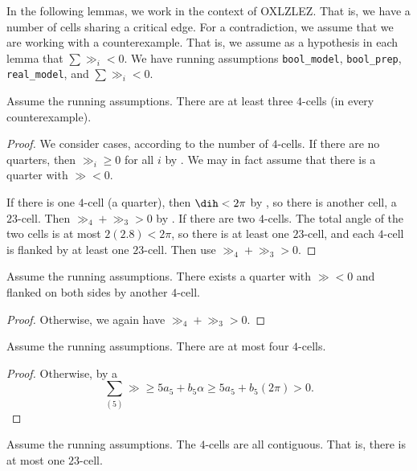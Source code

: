 \begin{remark}
In the following lemmas, we work in the context of OXLZLEZ.  That is, we have a number of cells sharing
a critical edge.  For a contradiction, we assume that we are working with a counterexample.  That is,
we assume as a hypothesis in each lemma that $\sum \gg_i < 0$.
We have running assumptions {\tt bool\_model}, {\tt  bool\_prep}, {\tt real\_model}, and $\sum\gg_i < 0$.
\end{remark}

\begin{lemma}\label{lemma:ox34}
Assume the running assumptions.
There are at least three $4$-cells (in every counterexample).
\end{lemma}

\begin{proof} We consider cases, according to the number of $4$-cells.  If there are no quarters, then
$\gg_i\ge0$ for all $i$ by .
We may in fact assume that there is a quarter with $\gg<0$.

If there is one $4$-cell (a quarter), then $\dih < 2\pi$ by , so there is another cell, a $23$-cell.
Then $\gg_4 + \gg_3 > 0$ by .
If there are two $4$-cells.  The total angle of the two cells is at most $2 (2.8) < 2\pi$, so there is at least one $23$-cell, and each $4$-cell is flanked by at least one $23$-cell.
Then use $\gg_4+\gg_3>0$.
\end{proof}

\begin{lemma}\label{lemma:ox2} 
Assume the running assumptions.
There exists a quarter with $\gg<0$ and flanked on both sides by another $4$-cell.
\end{lemma}

\begin{proof}
Otherwise, we again have $\gg_4+\gg_3>0$.
\end{proof}

\begin{lemma}\label{lemma:ox44}
Assume the running assumptions.  There are at most four $4$-cells.
\end{lemma}

\begin{proof}
  Otherwise, by a 
\[
\sum_{(5)} \gg \ge 5 a_5 + b_5\alpha \ge 5 a_5 +  b_5 (2\pi) > 0.
\]
\end{proof}

\begin{lemma}\label{lemma:oxC}
Assume the running assumptions.  The $4$-cells are all contiguous.  That is, there is at most one $23$-cell.
\end{lemma}

